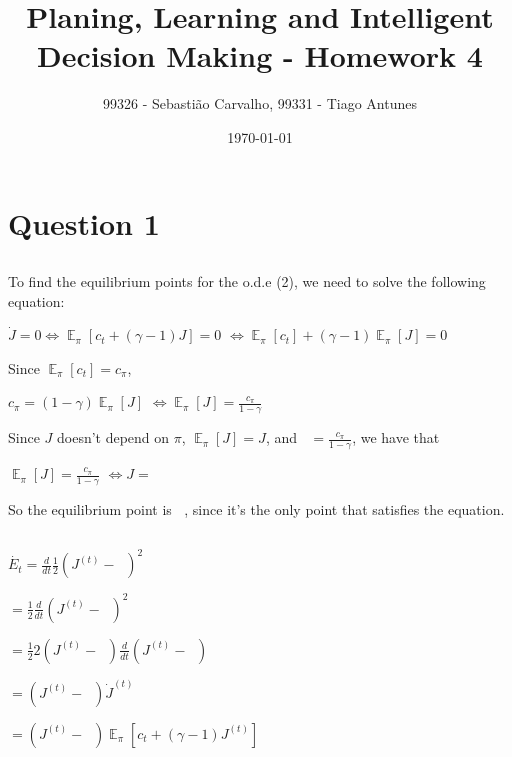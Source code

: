 \documentclass{article}
\title{Planing, Learning and Intelligent Decision Making - Homework 4}
\author{99326 - Sebastião Carvalho, 99331 - Tiago Antunes}
\date{\today}
\DeclareMathOperator{\EX}{\mathbb{E}}%
\DeclareMathOperator{\JPI}{J^\pi} %
\begin{document}
\maketitle

\tableofcontents

\section{Question 1}

\subsection{}

To find the equilibrium points for the o.d.e (2), we need to solve the following equation:

\medskip

$\dot{J} = 0 \Leftrightarrow \EX_\pi[c_t + (\gamma - 1) J] = 0$
$\Leftrightarrow \EX_\pi[c_t] + (\gamma - 1) \EX_\pi[J] = 0$

\medskip

Since $\EX_\pi[c_t] = c_\pi$, 

\medskip

$c_\pi = (1 - \gamma) \EX_\pi[J]$
$\Leftrightarrow \EX_\pi[J] = \frac{c_\pi}{1 - \gamma}$

\medskip

Since $J$ doesn't depend on $\pi$, $\EX_\pi[J] = J$, and $\JPI = \frac{c_\pi}{1 - \gamma}$, we have that 

\medskip

$\EX_\pi[J] = \frac{c_\pi}{1 - \gamma}$
$\Leftrightarrow J = \JPI$

\medskip

So the equilibrium point is $\JPI$, since it's the only point that satisfies the equation.

\subsection{}

$\dot{E_t} = \frac{d}{dt}  \frac{1}{2}  \left(J^{(t)} - \JPI \right)^2$

$ = \frac{1}{2}  \frac{d}{dt}  \left(J^{(t)} - \JPI \right)^2$

$ = \frac{1}{2}  2 \left(J^{(t)} - \JPI \right) \frac{d}{dt}  \left(J^{(t)} - \JPI \right)$

$ = \left(J^{(t)} - \JPI \right) \dot{J}^{(t)}$

$ = \left(J^{(t)} - \JPI \right) \EX_\pi[c_t + (\gamma - 1) J^{(t)}]$
\end{document}
